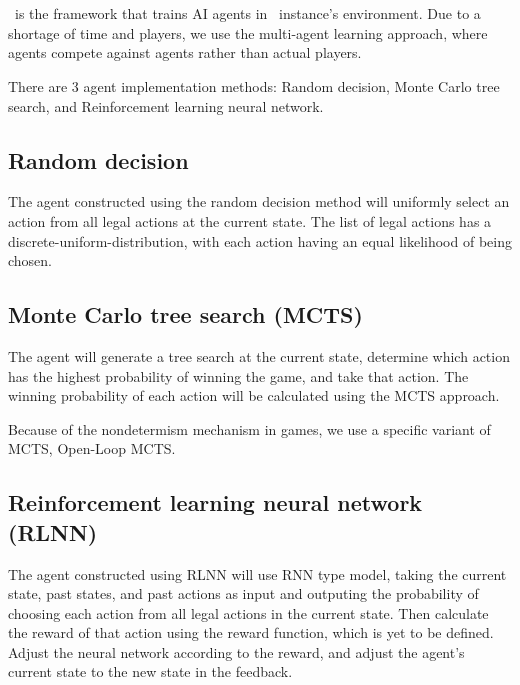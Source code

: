 \section{\RootAI}
\RootAI \ is the framework that trains AI agents in \RootOurs \ instance’s environment. Due to a shortage of time and players, we use the multi-agent learning approach, where agents compete against agents rather than actual players.

There are 3 agent implementation methods: Random decision, Monte Carlo tree search, and Reinforcement learning neural network.

\subsection{Random decision}
The agent constructed using the random decision method will uniformly select an action from all legal actions at the current state. The list of legal actions has a \gls{discrete-uniform-distribution}, with each action having an equal likelihood of being chosen. %


\subsection{Monte Carlo tree search (MCTS)} %
The agent will generate a tree search at the current state, determine which action has the highest probability of winning the game, and take that action. The winning probability of each action will be calculated using the MCTS approach. 

Because of the nondetermism mechanism in games, we use a specific variant of MCTS, Open-Loop MCTS.

\subsection{Reinforcement learning neural network (RLNN)} %
The agent constructed using RLNN will use RNN type model, taking the current state, past states, and past actions as input and outputing the probability of choosing each action from all legal actions in the current state. Then calculate the reward of that action using the reward function, which is yet to be defined. Adjust the neural network according to the reward, and adjust the agent’s current state to the new state in the feedback. %


